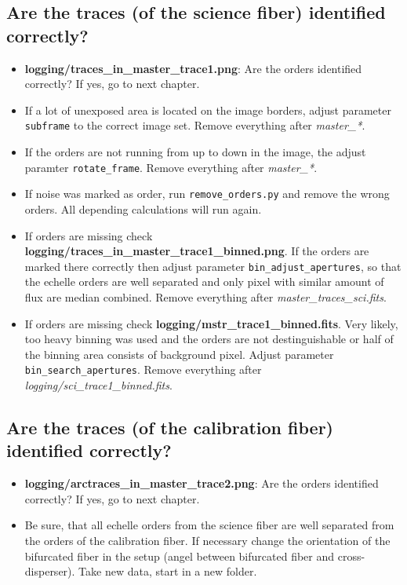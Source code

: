 \documentclass[10pt,a4paper]{article}
\begin{document}
\subsection{Are the traces (of the science fiber) identified correctly?}
\begin{itemize}
  \item \textbf{logging/traces\_in\_master\_trace1.png}: Are the orders identified correctly? If yes, go to next chapter.
  \item If a lot of unexposed area is located on the image borders, adjust parameter \verb|subframe| to the correct image set. Remove everything after \textit{master\_*}.
  \item If the orders are not running from up to down in the image, the adjust paramter \verb|rotate_frame|.  Remove everything after \textit{master\_*}.
  \item If noise was marked as order, run \verb|remove_orders.py| and remove the wrong orders. All depending calculations will run again.
  \item If orders are missing check \textbf{logging/traces\_in\_master\_trace1\_binned.png}. If the orders are marked there correctly then adjust parameter \verb|bin_adjust_apertures|, so that the echelle orders are well separated and only pixel with similar amount of flux are median combined. Remove everything after \textit{master\_traces\_sci.fits}.
  \item If orders are missing check \textbf{logging/mstr\_trace1\_binned.fits}. Very likely, too heavy binning was used and the orders are not destinguishable or half of the binning area consists of background pixel. Adjust parameter \verb|bin_search_apertures|. Remove everything after \textit{logging/sci\_trace1\_binned.fits}.
\end{itemize}


\subsection{Are the traces (of the calibration fiber) identified correctly?}
\begin{itemize}
  \item \textbf{logging/arctraces\_in\_master\_trace2.png}: Are the orders identified correctly? If yes, go to next chapter.
  \item Be sure, that all echelle orders from the science fiber are well separated from the orders of the calibration fiber. If necessary change the orientation of the bifurcated fiber in the setup (angel between bifurcated fiber and cross-disperser). Take new data, start in a new folder.
\end{itemize}
\end{document}
